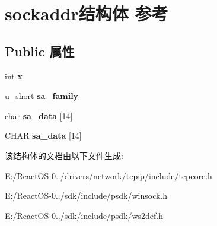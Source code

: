 \hypertarget{structsockaddr}{}\section{sockaddr结构体 参考}
\label{structsockaddr}
\subsection*{Public 属性}
\begin{DoxyCompactItemize}
\item 
\mbox{\label{structsockaddr_ab272e3ab08562cd58bac3ca2537af68e}} 
int {\bfseries x}
\item 
\mbox{\label{structsockaddr_a360526b9fb2f63b2569dfa5effd03bb3}} 
u\+\_\+short {\bfseries sa\+\_\+family}
\item 
\mbox{\label{structsockaddr_afd5d95d56d0f8959f5b56458b3b3c714}} 
char {\bfseries sa\+\_\+data} \mbox{[}14\mbox{]}
\item 
\mbox{\label{structsockaddr_a2883e265a9be67904aab1a8783c9dd37}} 
C\+H\+AR {\bfseries sa\+\_\+data} \mbox{[}14\mbox{]}
\end{DoxyCompactItemize}


该结构体的文档由以下文件生成\+:\begin{DoxyCompactItemize}
\item 
E\+:/\+React\+O\+S-\/0../drivers/network/tcpip/include/tcpcore.\+h\item 
E\+:/\+React\+O\+S-\/0../sdk/include/psdk/winsock.\+h\item 
E\+:/\+React\+O\+S-\/0../sdk/include/psdk/ws2def.\+h\end{DoxyCompactItemize}
